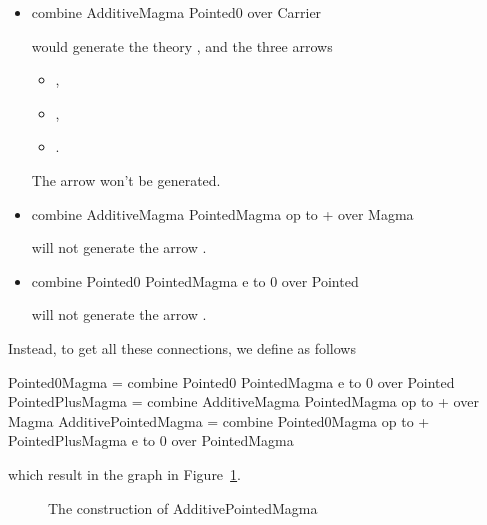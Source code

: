 \begin{itemize}
 \item  
\begin{togcode}
combine AdditiveMagma {} Pointed0 {} over Carrier
\end{togcode}
would generate the theory , and the three arrows 
\begin{itemize}
    \item {}, 
    \item {}, 
    \item {}. 
\end{itemize}
The arrow  won't be generated. 

\item  
\begin{togcode}
combine AdditiveMagma {} PointedMagma {op to +} over Magma 
\end{togcode}
will not generate the arrow . 

\item 
\begin{togcode}
combine Pointed0 {} PointedMagma {e to 0} over Pointed 
\end{togcode}
will not generate the arrow . 
\end{itemize}
Instead, to get all these connections, we define  as follows 
\begin{togcode}
Pointed0Magma = 
  combine Pointed0 {} PointedMagma {e to 0} over Pointed
PointedPlusMagma = 
  combine AdditiveMagma {} PointedMagma {op to +} over Magma
AdditivePointedMagma = 
  combine Pointed0Magma {op to +} PointedPlusMagma {e to 0} 
  over PointedMagma
\end{togcode}
which result in the graph in Figure~\ref{fig:addPointedMagmaReal}.  
\begin{figure}[h]
    \caption{The construction of AdditivePointedMagma}
    \label{fig:addPointedMagmaReal}
\end{figure}

